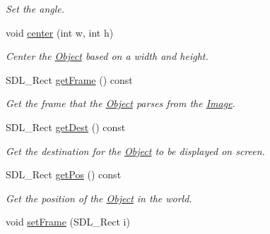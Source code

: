 \begin{DoxyCompactItemize}
\begin{DoxyCompactList}\small\item\em Set the angle. \end{DoxyCompactList}\item 
void \hyperlink{classObject_a95af63b61c22ac2a8117742b9fa0efb5}{center} (int w, int h)\hypertarget{classObject_a95af63b61c22ac2a8117742b9fa0efb5}{}\label{classObject_a95af63b61c22ac2a8117742b9fa0efb5}

\begin{DoxyCompactList}\small\item\em Center the \hyperlink{classObject}{Object} based on a width and height. \end{DoxyCompactList}\item 
S\+D\+L\+\_\+\+Rect \hyperlink{classObject_a8bebf403c97590d3333de2cd073670f9}{get\+Frame} () const \hypertarget{classObject_a8bebf403c97590d3333de2cd073670f9}{}\label{classObject_a8bebf403c97590d3333de2cd073670f9}

\begin{DoxyCompactList}\small\item\em Get the frame that the \hyperlink{classObject}{Object} parses from the \hyperlink{classImage}{Image}. \end{DoxyCompactList}\item 
S\+D\+L\+\_\+\+Rect \hyperlink{classObject_acecef2e384a8f507f533f18dcd376d05}{get\+Dest} () const \hypertarget{classObject_acecef2e384a8f507f533f18dcd376d05}{}\label{classObject_acecef2e384a8f507f533f18dcd376d05}

\begin{DoxyCompactList}\small\item\em Get the destination for the \hyperlink{classObject}{Object} to be displayed on screen. \end{DoxyCompactList}\item 
S\+D\+L\+\_\+\+Rect \hyperlink{classObject_a53675f3a562b20883cae4ffba4166478}{get\+Pos} () const \hypertarget{classObject_a53675f3a562b20883cae4ffba4166478}{}\label{classObject_a53675f3a562b20883cae4ffba4166478}

\begin{DoxyCompactList}\small\item\em Get the position of the \hyperlink{classObject}{Object} in the world. \end{DoxyCompactList}\item 
void \hyperlink{classObject_a720ff968db3849ae49437fc8d01246ef}{set\+Frame} (S\+D\+L\+\_\+\+Rect i)\hypertarget{classObject_a720ff968db3849ae49437fc8d01246ef}{}\label{classObject_a720ff968db3849ae49437fc8d01246ef}


\end{DoxyCompactItemize}
